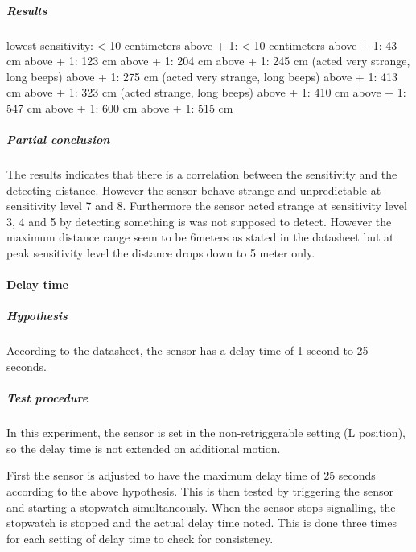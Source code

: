 \subparagraph{Results}

lowest sensitivity: < 10 centimeters
above + 1: < 10 centimeters
above + 1: 43 cm
above + 1: 123 cm
above + 1: 204 cm
above + 1: 245 cm (acted very strange, long beeps)
above + 1: 275 cm (acted very strange, long beeps)
above + 1: 413 cm
above + 1: 323 cm (acted strange, long beeps)
above + 1: 410 cm
above + 1: 547 cm
above + 1: 600 cm
above + 1: 515 cm


\subparagraph{Partial conclusion}
The results indicates that there is a correlation between the sensitivity and the detecting distance.
However the sensor behave strange and unpredictable at sensitivity level 7 and 8.
Furthermore the sensor acted strange at sensitivity level 3, 4 and 5 by detecting something is was not supposed to detect.
However the maximum distance range seem to be 6meters as stated in the datasheet but at peak sensitivity level
the distance drops down to 5 meter only.

\paragraph{Delay time}

\subparagraph{Hypothesis}

According to the datasheet, the sensor has a delay time of 1 second to 25 seconds.

\subparagraph{Test procedure}

In this experiment, the sensor is set in the non-retriggerable setting (L
position), so the delay time is not extended on additional motion.

First the sensor is adjusted to have the maximum delay time of 25 seconds
according to the above hypothesis. This is then tested by triggering the sensor
and starting a stopwatch simultaneously. When the sensor stops signalling, the
stopwatch is stopped and the actual delay time noted. This is done three times
for each setting of delay time to check for consistency.

